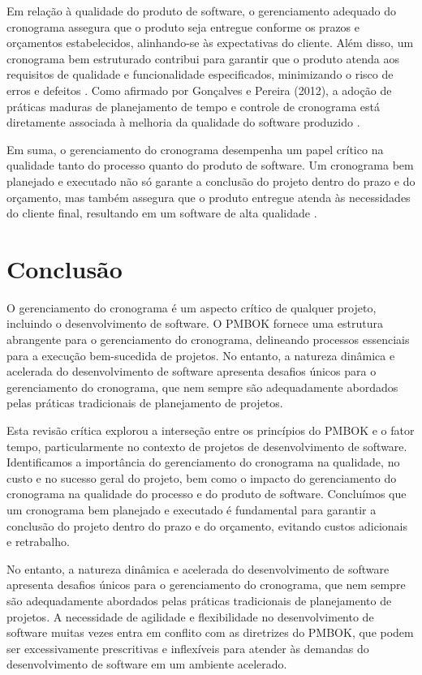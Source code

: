 \documentclass[
	12pt,				%
	oneside,			%
	a4paper,			%
	english,			%
	brazil				%
	]{abntex2unama}
\begin{document}
Em relação à qualidade do produto de software, o gerenciamento adequado do cronograma assegura que o produto seja entregue conforme os prazos e orçamentos estabelecidos, alinhando-se às expectativas do cliente. Além disso, um cronograma bem estruturado contribui para garantir que o produto atenda aos requisitos de qualidade e funcionalidade especificados, minimizando o risco de erros e defeitos \cite{Sepasgozar_Delay_2019}. Como afirmado por Gonçalves e Pereira (2012), a adoção de práticas maduras de planejamento de tempo e controle de cronograma está diretamente associada à melhoria da qualidade do software produzido \cite{Gonçalves_Pereira_2012}.

Em suma, o gerenciamento do cronograma desempenha um papel crítico na qualidade tanto do processo quanto do produto de software. Um cronograma bem planejado e executado não só garante a conclusão do projeto dentro do prazo e do orçamento, mas também assegura que o produto entregue atenda às necessidades do cliente final, resultando em um software de alta qualidade \cite{Ghasemabadi_PMBOK_2011} \cite{Sepasgozar_Delay_2019}.

\chapter{Conclusão}

O gerenciamento do cronograma é um aspecto crítico de qualquer projeto, incluindo o desenvolvimento de software. O PMBOK fornece uma estrutura abrangente para o gerenciamento do cronograma, delineando processos essenciais para a execução bem-sucedida de projetos. No entanto, a natureza dinâmica e acelerada do desenvolvimento de software apresenta desafios únicos para o gerenciamento do cronograma, que nem sempre são adequadamente abordados pelas práticas tradicionais de planejamento de projetos.

Esta revisão crítica explorou a interseção entre os princípios do PMBOK e o fator tempo, particularmente no contexto de projetos de desenvolvimento de software. Identificamos a importância do gerenciamento do cronograma na qualidade, no custo e no sucesso geral do projeto, bem como o impacto do gerenciamento do cronograma na qualidade do processo e do produto de software. Concluímos que um cronograma bem planejado e executado é fundamental para garantir a conclusão do projeto dentro do prazo e do orçamento, evitando custos adicionais e retrabalho.

No entanto, a natureza dinâmica e acelerada do desenvolvimento de software apresenta desafios únicos para o gerenciamento do cronograma, que nem sempre são adequadamente abordados pelas práticas tradicionais de planejamento de projetos. A necessidade de agilidade e flexibilidade no desenvolvimento de software muitas vezes entra em conflito com as diretrizes do PMBOK, que podem ser excessivamente prescritivas e inflexíveis para atender às demandas do desenvolvimento de software em um ambiente acelerado.
\end{document}
